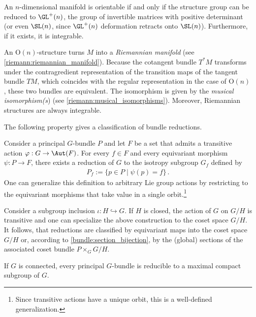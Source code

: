     \begin{example}\label{bundle:orientable_structure}
        An $n$-dimensional manifold is orientable if and only if the structure group can be reduced to $\GL^+(n)$, the group of invertible matrices with positive determinant (or even $\SL(n)$, since $\GL^+(n)$ deformation retracts onto $\SL(n)$). Furthermore, if it exists, it is integrable.
    \end{example}
    \begin{example}\label{bundle:riemannian_G_structure}
        An $\mathrm{O}(n)$-structure turns $M$ into a \textit{Riemannian manifold} (see \cref{riemann:riemannian_manifold}). Because the cotangent bundle $T^*M$ transforms under the contragredient representation of the transition maps of the tangent bundle $TM$, which coincides with the regular representation in the case of $\mathrm{O}(n)$, these two bundles are equivalent. The isomorphism is given by the \textit{musical isomorphism(s}) (see \cref{riemann:musical_isomorphisms}). Moreover, Riemannian structures are always integrable.
    \end{example}

    The following property gives a classification of bundle reductions.
    \begin{property}\label{bundle:reduction_classification}
        Consider a principal $G$-bundle $P$ and let $F$ be a set that admits a transitive action $\varphi:G\rightarrow\Aut(F)$. For every $f\in F$ and every equivariant morphism $\psi:P\rightarrow F$, there exists a reduction of $G$ to the isotropy subgroup $G_f$ defined by
        \begin{gather}
            P_f := \{p\in P\mid\psi(p) = f\}\,.
        \end{gather}
        One can generalize this definition to arbitrary Lie group actions by restricting to the equivariant morphisms that take value in a single orbit.\footnote{Since transitive actions have a unique orbit, this is a well-defined generalization.}

        Consider a subgroup inclusion $\iota:H\hookrightarrow G$. If $H$ is closed, the action of $G$ on $G/H$ is transitive and one can specialize the above construction to the coset space $G/H$. It follows, that reductions are classified by equivariant maps into the coset space $G/H$ or, according to \cref{bundle:section_bijection}, by the (global) sections of the associated coset bundle $P\times_GG/H$.
    \end{property}
    \begin{result}
        If $G$ is connected, every principal $G$-bundle is reducible to a maximal compact subgroup of $G$.
    \end{result}


